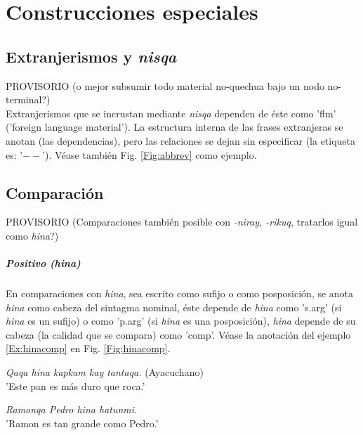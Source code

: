 \documentclass[a4paper,11pt,DIV12]{scrartcl}
\begin{document}
\section{Construcciones especiales}
\subsection{Extranjerismos y {\em nisqa}}
PROVISORIO (o mejor subsumir todo material no-quechua bajo un nodo no-terminal?)\\
Extranjerismos que se incrustan mediante {\em nisqa} dependen de \'este como 'flm' ('foreign language material'). La estructura interna de las frases extranjeras se anotan (las dependencias), pero las relaciones se dejan sin especificar (la etiqueta es: '$--$'). V\'ease tambi\'en Fig. \ref{Fig:abbrev} como ejemplo.




\subsection{Comparaci\'on}\label{Sec:comparacion}
PROVISORIO (Comparaciones tambi\'en posible con {\em -niray, -rikuq}, tratarlos igual como {\em hina}?)

\subparagraph{Positivo ({\em hina})}

En comparaciones con {\em hina}, sea escrito como sufijo o como posposici\'on, se anota {\em hina} como cabeza del sintagma nominal, \'este depende de {\em hina} como 's.arg' (si {\em hina} es un sufijo) o como 'p.arg' (si {\em hina} es una posposici\'on), {\em hina} depende de su cabeza (la calidad que se compara) como 'comp'. V\'ease la anotaci\'on del ejemplo \ref{Ex:hinacomp} en Fig. \ref{Fig:hinacomp}.

\begin{examples}
 \item\label{Ex:hinacomp} {\em Qaqa hina kapkam kay tantaqa.} (Ayacuchano)\\
      'Este pan es m\'as duro que roca.'
 \item {\em Ramonqa Pedro hina hatunmi.}\\
      'Ramon es tan grande como Pedro.'\\
	\hfill{\small \citep[189-190]{Dedenbach02}}
\end{examples}
\end{document}
